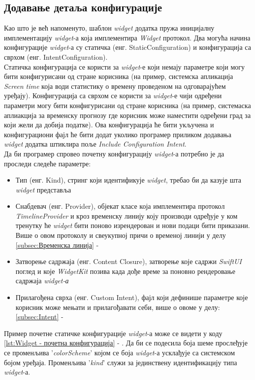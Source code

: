 \documentclass[12pt,oneside]{memoir}
\begin{document}
\subsection{Додавање детаља конфигурације}
\indent Као што је већ напоменуто, шаблон \textit{widget} додатка пружа иницијалну имплементацију \textit{widget}-а која имплементира \textit{Widget} протокол. Два могућа начина конфигурације \textit{widget}-а су статичка (енг. StaticConfiguration) и конфигурација са сврхом (енг. IntentConfiguration). \\
\indent Статичка конфигурација се користи за \textit{widget}-е који немају параметре који могу бити конфигурисани од стране корисника (на пример, системска апликација \textit{Screen time} која води статистику о времену проведеном на одговарајућем уређају). Конфигурација са сврхом се користи за \textit{widget}-е чији одређени параметри могу бити конфигурисани од стране корисника (на пример, системаска аплиакција за временску прогнозу где корисник може наместити одређени град за који жели да добија податке). Ова конфигурација ће бити укључена и конфигурациони фајл ће бити додат уколико програмер приликом додавања \textit{widget} додатка штиклира поље \textit{Include Configuration Intent}.
\\
\indent Да би програмер спровео почетну конфигурацију \textit{widget}-а потребно је да проследи следеће параметре:
\begin{itemize}
    \item Тип (енг. Kind), стринг који идентификује \textit{widget}, требао би да казује шта \textit{widget} представља
    \item Снабдевач (енг. Provider), објекат класе која имплементира протокол \textit{TimelineProvider} и кроз временску линију коју производи одређује у ком тренутку ће \textit{widget} бити поново изрендерован и нови подаци бити приказани. Више о овом протоколу и свеукупној причи о временој линији у делу \ref{subsec:Временска линија} - 
    \item Затворење садржаја (енг. Content Closure), затворење које садржи \textit{SwiftUI} поглед и које \textit{WidgetKit} позива када дође време за поновно рендеровање садржаја \textit{widget-а}
    \item Прилагођена сврха (енг. Custom Intent), фајл који дефинише параметре које корисник може мењати и прилагођавати себи, више о овоме у делу: \ref{subsec:Intent} - 
\end{itemize}
Пример почетне статичке конфигурације \textit{widget}-а може се видети у коду \ref{lst:Widget - почетна конфигурација} - . Да би се подесила боја шеме прослеђује се променљива '\textit{colorScheme}' којом се боја \textit{widget}-а усклађује са системском бојом уређаја. Променљива '\textit{kind}' служи за јединствену идентификацију типа \textit{widget}-а. 
\end{document}
